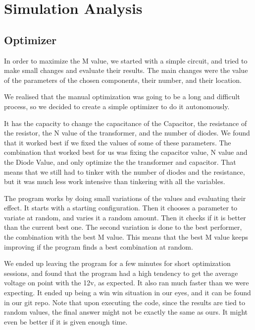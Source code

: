 \section{Simulation Analysis}
\label{sec:simulation analysis}
\subsection{Optimizer}
In order to maximize the M value, we started with a simple  circuit, and tried to make small changes and evaluate their results. The main changes were the value of the parameters of the chosen components, their number, and their location.

We realised that the manual optimization was going to be a long and difficult process, so we decided to create a simple optimizer to do it autonomously.

It has the capacity to change the capacitance of the Capacitor, the resistance of the resistor, the N value of the transformer, and the number of diodes. We found that it worked best if we fixed the values of some of these parameters. The combination that worked best for us was fixing the capacitor value, N value and the Diode Value, and only optimize the the transformer and capacitor.  That means that we still had to tinker with the number of diodes and the resistance, but it was much less work intensive than tinkering with all the variables.

The program works by doing small variations of the values and evaluating their effect. It starts with a starting configuration. Then it chooses a parameter to variate at random, and varies it a random amount. Then it checks if it is better than the current best one. The second variation is done to the best performer, the combination with the best M value. This means that the best M value keeps improving if the program finds a best combination at random.

We ended up leaving the program for a few minutes for short optimization sessions, and found that the program had a high tendency to get the average voltage on point with the 12v, as expected. It also ran much faster than we were expecting. It ended up being a win win situation in our eyes, and it can be found in our git repo. Note that upon executing the code, since the results are tied to random values, the final answer might not be exactly the same as ours. It might even be better if it is given enough time.


